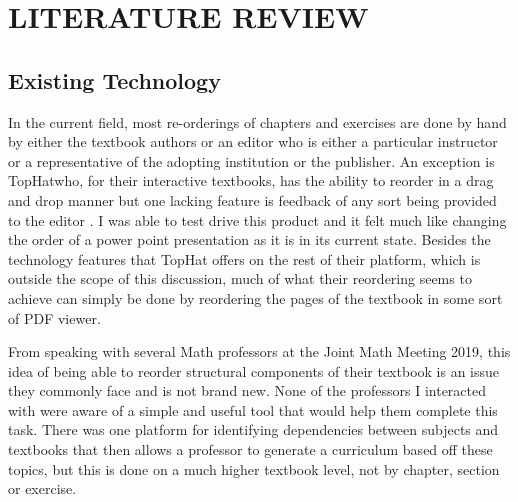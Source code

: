%
%
%
%


\pagestyle{plain} %

\chapter{LITERATURE REVIEW}

\section{Existing Technology}

In the current field, most re-orderings of chapters and exercises are done by hand by either the textbook authors or an editor who is either a particular instructor or a representative of the adopting institution or the publisher. An exception is TopHat\texttrademark\;who, for their interactive textbooks, has the ability to reorder in a drag and drop manner but one lacking feature is feedback of any sort being provided to the editor \cite{tophat}. I was able to test drive this product and it felt much like changing the order of a power point presentation as it is in its current state. Besides the technology features that TopHat offers on the rest of their platform, which is outside the scope of this discussion, much of what their reordering seems to achieve can simply be done by reordering the pages of the textbook in some sort of PDF viewer.

From speaking with several Math professors at the Joint Math Meeting 2019, this idea of being able to reorder structural components of their textbook is an issue they commonly face and is not brand new. None of the professors I interacted with were aware of a simple and useful tool that would help them complete this task. There was one platform for identifying dependencies between subjects and textbooks that then allows a professor to generate a curriculum based off these topics, but this is done on a much higher textbook level, not by chapter, section or exercise.

